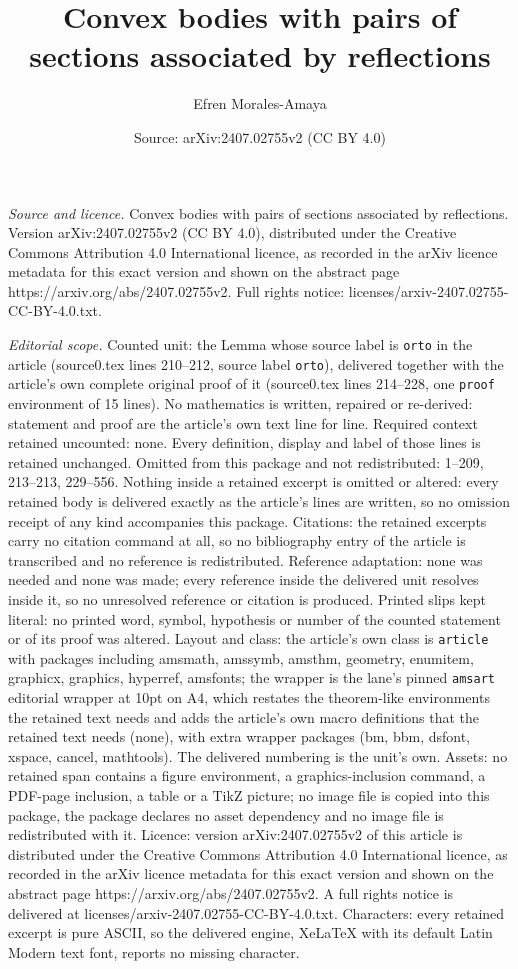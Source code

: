 \documentclass[10pt,a4paper]{amsart}
\title[Convex bodies with pairs of sections associated by reflectio]{Convex bodies with pairs of sections associated by reflections}
\author{Efren Morales-Amaya}
\date{Source: arXiv:2407.02755v2 (CC BY 4.0)}
\begin{document}
\maketitle

\noindent\emph{Source and licence.} Convex bodies with pairs of sections associated by reflections. Version arXiv:2407.02755v2 (CC BY 4.0), distributed under the Creative Commons Attribution 4.0 International licence, as recorded in the arXiv licence metadata for this exact version and shown on the abstract page https://arxiv.org/abs/2407.02755v2. Full rights notice: licenses/arxiv-2407.02755-CC-BY-4.0.txt.\par\smallskip

\noindent\textit{Editorial scope.} Counted unit: the Lemma whose source label is \texttt{orto} in the article (source0.tex lines 210--212, source label \texttt{orto}), delivered together with the article's own complete original proof of it (source0.tex lines 214--228, one \texttt{proof} environment of 15 lines). No mathematics is written, repaired or re-derived: statement and proof are the article's own text line for line. Required context retained uncounted: none. Every definition, display and label of those lines is retained unchanged. Omitted from this package and not redistributed: 1--209, 213--213, 229--556. Nothing inside a retained excerpt is omitted or altered: every retained body is delivered exactly as the article's lines are written, so no omission receipt of any kind accompanies this package. Citations: the retained excerpts carry no citation command at all, so no bibliography entry of the article is transcribed and no reference is redistributed. Reference adaptation: none was needed and none was made; every reference inside the delivered unit resolves inside it, so no unresolved reference or citation is produced. Printed slips kept literal: no printed word, symbol, hypothesis or number of the counted statement or of its proof was altered. Layout and class: the article's own class is \texttt{article} with packages including amsmath, amssymb, amsthm, geometry, enumitem, graphicx, graphics, hyperref, amsfonts; the wrapper is the lane's pinned \texttt{amsart} editorial wrapper at 10pt on A4, which restates the theorem-like environments the retained text needs and adds the article's own macro definitions that the retained text needs (none), with extra wrapper packages (bm, bbm, dsfont, xspace, cancel, mathtools). The delivered numbering is the unit's own. Assets: no retained span contains a figure environment, a graphics-inclusion command, a PDF-page inclusion, a table or a TikZ picture; no image file is copied into this package, the package declares no asset dependency and no image file is redistributed with it. Licence: version arXiv:2407.02755v2 of this article is distributed under the Creative Commons Attribution 4.0 International licence, as recorded in the arXiv licence metadata for this exact version and shown on the abstract page https://arxiv.org/abs/2407.02755v2. A full rights notice is delivered at licenses/arxiv-2407.02755-CC-BY-4.0.txt. Characters: every retained excerpt is pure ASCII, so the delivered engine, XeLaTeX with its default Latin Modern text font, reports no missing character.
\end{document}
